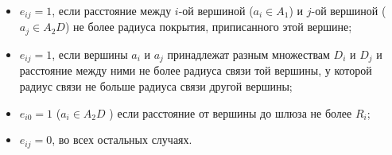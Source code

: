 \begin{itemize}
    \item $e_{ij} = 1$, если расстояние между $i$-ой вершиной ($a_i \in A_1$) и $j$-ой вершиной ($a_j \in A_2D$) не более радиуса покрытия, приписанного этой вершине;
    \item $e_{ij} = 1$, если вершины $a_i$ и $a_j$   принадлежат разным множествам $D_i$ и $D_j$ и расстояние между ними не более радиуса связи той вершины, у которой радиус связи не больше радиуса связи другой вершины;
    \item $e_{i0} = 1$ ($a_i \in A_2D$ ) если расстояние от вершины до шлюза не более $R_i$;
    \item $e_{ij} = 0$, во всех остальных случаях.
\end{itemize}









